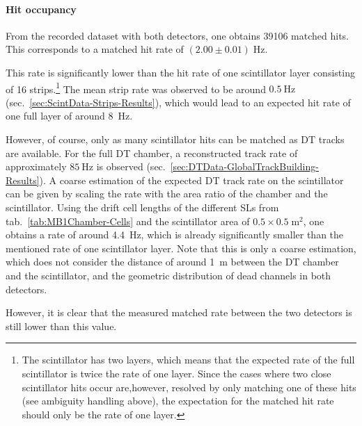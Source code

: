 \paragraph{Hit occupancy}
From the recorded dataset with both detectors, one obtains \num{39106} matched hits. This corresponds to a matched hit rate of $(2.00 \pm 0.01)\;\si{\hertz}$.
\par This rate is significantly lower than the hit rate of one scintillator layer consisting of 16 strips.\footnote{The scintillator has two layers, which means that the expected rate of the full scintillator is twice the rate of one layer. Since the cases where two close scintillator hits occur are,however, resolved by only matching one of these hits (see ambiguity handling above), the expectation for the matched hit rate should only be the rate of one layer.} The mean strip rate was observed to be around $\SI{0.5}{\hertz}$ (sec.\ \ref{sec:ScintData-Strips-Results}), which would lead to an expected hit rate of one full layer of around \SI{8}{\hertz}.
\par However, of course, only as many scintillator hits can be matched as \ac{DT} tracks are available. For the full \ac{DT} chamber, a reconstructed track rate of approximately $\SI{85}{\hertz}$ is observed (sec.\ \ref{sec:DTData-GlobalTrackBuilding-Results}). A coarse estimation of the expected \ac{DT} track rate on the scintillator can be given by scaling the rate with the area ratio of the chamber and the scintillator. Using the drift cell lengths of the different \acp{SL} from tab.\ \ref{tab:MB1Chamber-Cells} and the scintillator area of $0.5\times 0.5 \;\si{\meter^2}$, one obtains a rate of around \SI{4.4}{\hertz}, which is already significantly smaller than the mentioned rate of one scintillator layer. Note that this is only a coarse estimation, which does not consider the distance of around \SI{1}{\meter} between the \ac{DT} chamber and the scintillator, and the geometric distribution of dead channels in both detectors.
\par However, it is clear that the measured matched rate between the two detectors is still lower than this value.
